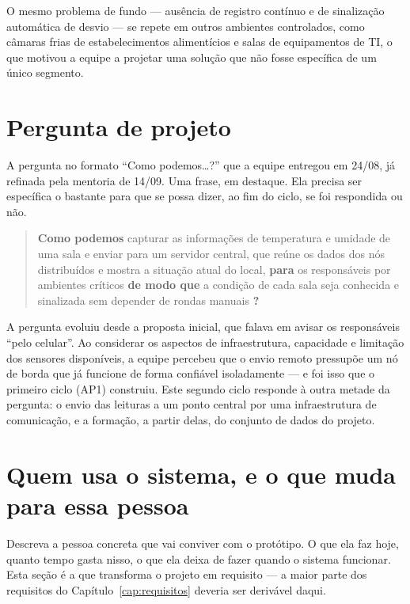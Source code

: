 O mesmo problema de fundo --- ausência de registro contínuo e de
sinalização automática de desvio --- se repete em outros ambientes
controlados, como câmaras frias de estabelecimentos alimentícios e
salas de equipamentos de TI, o que motivou a equipe a projetar uma
solução que não fosse específica de um único segmento.

\section{Pergunta de projeto}

\begin{orientacao}
A pergunta no formato \enquote{Como podemos\ldots?} que a equipe entregou
em 24/08, já refinada pela mentoria de 14/09. Uma frase, em destaque.
Ela precisa ser específica o bastante para que se possa dizer, ao fim do
ciclo, se foi respondida ou não.
\end{orientacao}

\begin{quote}
\textbf{Como podemos} capturar as informações de temperatura e umidade
de uma sala e enviar para um servidor central, que reúne os dados dos
nós distribuídos e mostra a situação atual do local, \textbf{para} os
responsáveis por ambientes críticos \textbf{de modo que} a condição de
cada sala seja conhecida e sinalizada sem depender de rondas manuais
\textbf{?}
\end{quote}

A pergunta evoluiu desde a proposta inicial, que falava em avisar os
responsáveis \enquote{pelo celular}. Ao considerar os aspectos de
infraestrutura, capacidade e limitação dos sensores disponíveis, a
equipe percebeu que o envio remoto pressupõe um nó de borda que já
funcione de forma confiável isoladamente --- e foi isso que o primeiro
ciclo (AP1) construiu. Este segundo ciclo responde à outra metade da
pergunta: o envio das leituras a um ponto central por uma
infraestrutura de comunicação, e a formação, a partir delas, do
conjunto de dados do projeto.

\section{Quem usa o sistema, e o que muda para essa pessoa}

\begin{orientacao}
Descreva a pessoa concreta que vai conviver com o protótipo. O que ela
faz hoje, quanto tempo gasta nisso, o que ela deixa de fazer quando o
sistema funcionar. Esta seção é a que transforma o projeto em requisito
--- a maior parte dos requisitos do Capítulo~\ref{cap:requisitos} deveria
ser derivável daqui.
\end{orientacao}

